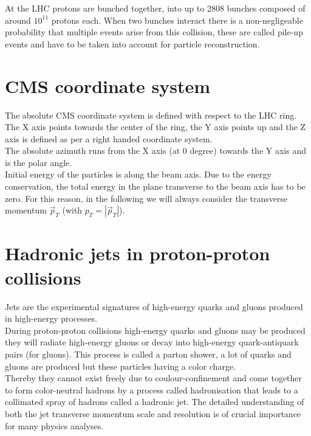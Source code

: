 At the LHC protons are bunched together, into up to 2808 bunches composed of around $10^{11}$ protons each.
When two bunches interact there is a non-negligeable probability that multiple events arise from this collision, these
are called pile-up events and have to be taken into account for particle reconstruction.

\section{CMS coordinate system}

The absolute CMS coordinate system is defined with respect to the LHC ring. The X axis points towards the center
of the ring, the Y axis points up and the Z axis is defined as per a right handed coordinate system. \\
The absolute azimuth \textphi runs from the X axis (at 0 degree) towards the Y axis and \texteta is the polar angle.\\
Initial energy of the particles is along the beam axis. Due to the energy conservation, the total energy in the plane
transverse to the beam axis has to be zero. For this reason, in the following we will always consider the transverse
momentum $\vec{p}_{T}$ (with $p_{T} = |\vec{p}_{T}|$).


\section{Hadronic jets in proton-proton collisions}

Jets are the experimental signatures of high-energy quarks and gluons produced in high-energy processes.\\
During proton-proton collisions high-energy quarks and gluons may be produced they will radiate high-energy gluons or
decay into high-energy quark-antiquark pairs (for gluons). This process is called a parton shower, a lot of quarks and
gluons are produced but these particles having a color charge.\\
Thereby they cannot exist freely due to coulour-confinement and come together to form color-neutral hadrons by a process called
hadronisation that leads to a collimated spray of hadrons called a hadronic jet.
The detailed understanding of both the jet transverse momentum scale and resolution is of crucial importance for many physics analyses.


